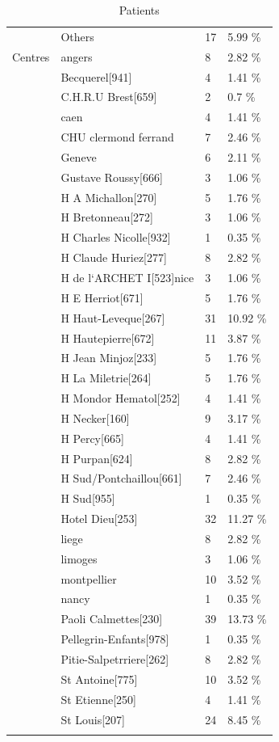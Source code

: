 \documentclass[a4paper,11pt] {article}
\begin{document}
\begin{longtable}{llll}
   & Others & 17 & 5.99 \% \\ 
  Centres & angers & 8 & 2.82 \% \\ 
   & Becquerel[941] & 4 & 1.41 \% \\ 
   & C.H.R.U Brest[659] & 2 & 0.7 \% \\ 
   & caen & 4 & 1.41 \% \\ 
   & CHU clermond ferrand & 7 & 2.46 \% \\ 
   & Geneve & 6 & 2.11 \% \\ 
   & Gustave Roussy[666] & 3 & 1.06 \% \\ 
   & H A Michallon[270] & 5 & 1.76 \% \\ 
   & H Bretonneau[272] & 3 & 1.06 \% \\ 
   & H Charles Nicolle[932] & 1 & 0.35 \% \\ 
   & H Claude Huriez[277] & 8 & 2.82 \% \\ 
   & H de l`ARCHET I[523]nice & 3 & 1.06 \% \\ 
   & H E Herriot[671] & 5 & 1.76 \% \\ 
   & H Haut-Leveque[267] & 31 & 10.92 \% \\ 
   & H Hautepierre[672] & 11 & 3.87 \% \\ 
   & H Jean Minjoz[233] & 5 & 1.76 \% \\ 
   & H La Miletrie[264] & 5 & 1.76 \% \\ 
   & H Mondor Hematol[252] & 4 & 1.41 \% \\ 
   & H Necker[160] & 9 & 3.17 \% \\ 
   & H Percy[665] & 4 & 1.41 \% \\ 
   & H Purpan[624] & 8 & 2.82 \% \\ 
   & H Sud/Pontchaillou[661] & 7 & 2.46 \% \\ 
   & H Sud[955] & 1 & 0.35 \% \\ 
   & Hotel Dieu[253] & 32 & 11.27 \% \\ 
   & liege & 8 & 2.82 \% \\ 
   & limoges & 3 & 1.06 \% \\ 
   & montpellier & 10 & 3.52 \% \\ 
   & nancy & 1 & 0.35 \% \\ 
   & Paoli Calmettes[230] & 39 & 13.73 \% \\ 
   & Pellegrin-Enfants[978] & 1 & 0.35 \% \\ 
   & Pitie-Salpetrriere[262] & 8 & 2.82 \% \\ 
   & St Antoine[775] & 10 & 3.52 \% \\ 
   & St Etienne[250] & 4 & 1.41 \% \\ 
   & St Louis[207] & 24 & 8.45 \% \\ 
   \hline
\hline
\caption{Patients} 
\label{tab:condi}
\end{longtable}
\end{document}

